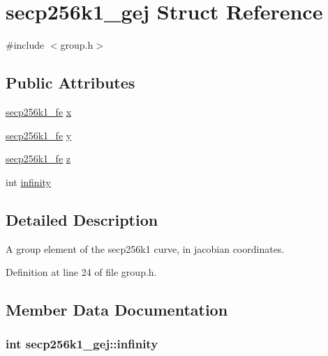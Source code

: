 \hypertarget{structsecp256k1__gej}{}\section{secp256k1\+\_\+gej Struct Reference}
\label{structsecp256k1__gej}


{\ttfamily \#include $<$group.\+h$>$}

\subsection*{Public Attributes}
\begin{DoxyCompactItemize}
\item 
\hyperlink{structsecp256k1__fe}{secp256k1\+\_\+fe} \hyperlink{structsecp256k1__gej_a7d2451c89411d62628ac466eb28c8ff5}{x}
\item 
\hyperlink{structsecp256k1__fe}{secp256k1\+\_\+fe} \hyperlink{structsecp256k1__gej_a29d5184060ad790d85a0c89a13820e0d}{y}
\item 
\hyperlink{structsecp256k1__fe}{secp256k1\+\_\+fe} \hyperlink{structsecp256k1__gej_ae41776408dba32cbe28b5e345b5f2286}{z}
\item 
int \hyperlink{structsecp256k1__gej_ab3ec8168caf27aa3a092d512eaadaad9}{infinity}
\end{DoxyCompactItemize}


\subsection{Detailed Description}
A group element of the secp256k1 curve, in jacobian coordinates. 

Definition at line 24 of file group.\+h.



\subsection{Member Data Documentation}
\hypertarget{structsecp256k1__gej_ab3ec8168caf27aa3a092d512eaadaad9}{}
\subsubsection[{infinity}]{\setlength{\rightskip}{0pt plus 5cm}int secp256k1\+\_\+gej\+::infinity}\label{structsecp256k1__gej_ab3ec8168caf27aa3a092d512eaadaad9}


